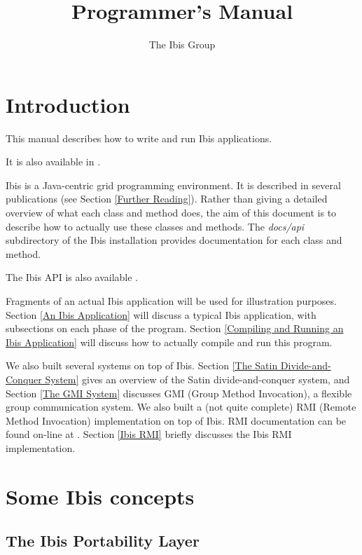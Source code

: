 \documentclass[10pt]{article}
\newcommand{\mysection}[1]{\section{#1}\label{#1}}
\newcommand{\mysubsection}[1]{\subsection{#1}\label{#1}}
\begin{document}
\title{
{}
{}
Programmer's Manual}

\author{The Ibis Group}

\maketitle

\section{Introduction}

This manual describes how to write and run Ibis applications.
\begin{htmlonly}
It is also available in
.
\end{htmlonly}
Ibis is a Java-centric grid programming environment.
It is described in several publications (see Section \ref{Further Reading}).
Rather than giving a detailed overview of what each class and method does,
the aim of this document is to describe how to actually use these classes
and methods.
The \emph{docs/api} subdirectory of the Ibis installation provides
documentation for each class and method.
\begin{htmlonly}
The Ibis API is also available
.
\end{htmlonly}
Fragments of an actual Ibis application will be used for illustration purposes.
Section \ref{An Ibis Application} will discuss a typical Ibis application,
with subsections on each phase of the program.
Section \ref{Compiling and Running an Ibis Application} will discuss how to
actually compile and run this program.

We also built several systems on top of Ibis.
Section \ref{The Satin Divide-and-Conquer System}
gives an overview of the Satin divide-and-conquer
system, and Section \ref{The GMI System} discusses GMI
(Group Method Invocation),
a flexible group communication system.
We also built a (not quite complete) RMI (Remote Method Invocation)
implementation on top of Ibis. RMI documentation can be found on-line at
{}
{}.
Section \ref{Ibis RMI} briefly discusses the Ibis RMI implementation.

\mysection{Some Ibis concepts}

\mysubsection{The Ibis Portability Layer}
\end{document}

